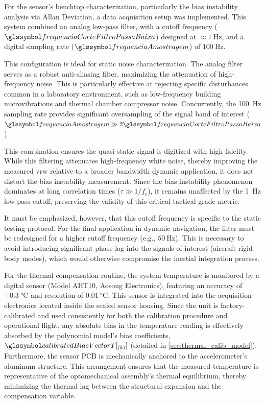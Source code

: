 \documentclass[sensors,article,accept,pdftex,moreauthors]{Definitions/mdpi}
\begin{document}
For the sensor's benchtop characterization, particularly the bias instability analysis via Allan Deviation, a data acquisition setup was implemented. This system combined an analog low-pass filter, with a cutoff frequency ($\frequenciaCorteFiltroPassaBaixa$) designed at $\approx\SI{1}{\hertz}$, and a digital sampling rate ($\frequenciaAmostragem$) of $\SI{100}{\hertz}$.

This configuration is ideal for static noise characterization. The analog filter serves as a robust anti-aliasing filter, maximizing the attenuation of high-frequency noise. This is particularly effective at rejecting specific disturbances common in a laboratory environment, such as low-frequency building microvibrations and thermal chamber compressor noise. Concurrently, the \SI{100}{\hertz} sampling rate provides significant oversampling of the signal band of interest ($\frequenciaAmostragem\gg2\frequenciaCorteFiltroPassaBaixa$).



This combination ensures the quasi-static signal is digitized with high fidelity. While this filtering attenuates high-frequency white noise, thereby improving the measured \gls{vrw} relative to a broader bandwidth dynamic application, it does not distort the bias instability measurement. Since the bias instability phenomenon dominates at long correlation times ($\tau \gg 1/f_{c}$), it remains unaffected by the \SI{1}{\hertz} low-pass cutoff, preserving the validity of this critical tactical-grade metric.

It must be emphasized, however, that this cutoff frequency is specific to the static testing protocol. For the final application in dynamic navigation, the filter must be redesigned for a higher cutoff frequency (e.g., $\SI{50}{\hertz}$). This is necessary to avoid introducing significant phase lag into the signals of interest (aircraft rigid-body modes), which would otherwise compromise the inertial integration process.

For the thermal compensation routine, the system temperature is monitored by a digital sensor (Model AHT10, Aosong Electronics), featuring an accuracy of $\pm\SI{0.3}{\celsius}$ and resolution of $\SI{0.01}{\celsius}$. This sensor is integrated into the acquisition electronics located inside the sealed sensor housing. Since the unit is factory-calibrated and used consistently for both the calibration procedure and operational flight, any absolute bias in the temperature reading is effectively absorbed by the polynomial model's bias coefficients,  $\calibratedBiasVectorT[{}_{(k)}]$ (detailed in \cref{sec:thermal_calib_model}). Furthermore, the sensor PCB is mechanically anchored to the accelerometer's aluminum structure. This arrangement ensures that the measured temperature is representative of the optomechanical assembly's thermal equilibrium, thereby minimizing the thermal lag between the structural expansion and the compensation variable.
\end{document}
